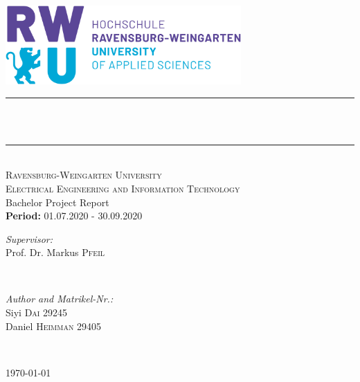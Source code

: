 \begin{titlepage}

\newcommand{\HRule}{\rule{\linewidth}{0.3mm}} %


\center %
\includegraphics[width=9cm]{title/logo.png}\\[1.5cm]


\makeatletter
\HRule \\[0.8cm]
{ \huge \bfseries \@title}\\[0.4cm] %
\HRule \\[0.5cm]


\textsc{\Large Ravensburg-Weingarten University}\\[0.3cm] 
\textsc{\large Electrical Engineering and Information Technology}\\ [1.5cm]


\large Bachelor Project Report  \large\\
\textbf{Period:} 01.07.2020 - 30.09.2020\large\



\vspace{2.5cm}

\begin{minipage}{0.4\textwidth}
\begin{flushleft} \large
\emph{Supervisor:} \\ Prof. Dr. Markus \textsc{Pfeil} 
\end{flushleft}
\end{minipage}
~
\begin{minipage}{0.4\textwidth}
\begin{flushright}\large
\emph{Author and Matrikel-Nr.:}\\ 
Siyi \textsc{Dai} 29245\\
Daniel \textsc{Heimman} 29405 \\

\end{flushright}
\end{minipage}\\[2cm]

\makeatother

{\large \today}\\[7cm] 



\vfill %

\end{titlepage}


